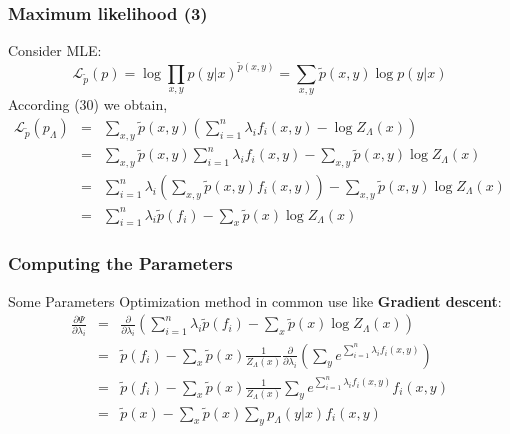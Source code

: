 \documentclass[slidestop,compress,mathserif]{beamer}
\begin{document}
	\begin{frame}[shrink]
		\frametitle{Maximum likelihood (3)}
		Consider MLE:
		\begin{equation}
			\mathcal{L}_{\widetilde{p}}(p) = \log \prod_{x,y} p(y|x)^{\widetilde{p}(x,y)} = \sum_{x,y}\widetilde{p}(x,y)\log p(y|x)
		\end{equation}
		According (30) we obtain,
		\begin{eqnarray*}
			\mathcal{L}_{\widetilde{p}}(p_\Lambda) &=& \sum_{x,y}\widetilde{p}(x,y)\left(\sum_{i=1}^{n} \lambda_if_i(x,y) - \log Z_\Lambda(x) \right)\\
			&=& \sum_{x,y}\widetilde{p}(x,y)\sum_{i=1}^{n}\lambda_if_i(x,y)-\sum_{x,y}\widetilde{p}(x,y)\log Z_\Lambda(x) \\
			&=& \sum_{i=1}^{n}\lambda_i\left(\sum_{x,y}\widetilde{p}(x,y)f_i(x,y)\right) - \sum_{x,y}\widetilde{p}(x,y)\log Z_\Lambda(x)\\
			&=& \sum_{i=1}^{n}\lambda_i\widetilde{p}(f_i) - \sum_x\widetilde{p}(x)\log Z_\Lambda(x)
		\end{eqnarray*}
	\end{frame}
	
	\begin{frame}
		\frametitle{Computing the Parameters}
		Some Parameters Optimization method in common use like\textbf{ Gradient descent}:
		\begin{eqnarray*}
			\frac{\partial\Psi}{\partial\lambda_i} &=& \frac{\partial}{\partial\lambda_i}\left(\sum_{i=1}^{n}\lambda_i\widetilde{p}(f_i) - \sum_x\widetilde{p}(x)\log Z_{\Lambda}(x) \right)\\
			&=& \widetilde{p}(f_i) - \sum_x\widetilde{p}(x)\frac{1}{Z_{\Lambda}(x)}\frac{\partial}{\partial\lambda_i}\left(\sum_y e^{\sum_{i=1}^{n}\lambda_if_i(x,y)} \right)\\
			&=& \widetilde{p}(f_i) - \sum_x\widetilde{p}(x)\frac{1}{Z_{\Lambda}(x)}\sum_y e^{\sum_{i=1}^{n}\lambda_if_i(x,y)}f_i(x,y)\\
			&=& \widetilde{p}(x) - \sum_x \widetilde{p}(x)\sum_y p_{\Lambda}(y|x)f_i(x,y)
		\end{eqnarray*}
	\end{frame}
	
\end{document}
